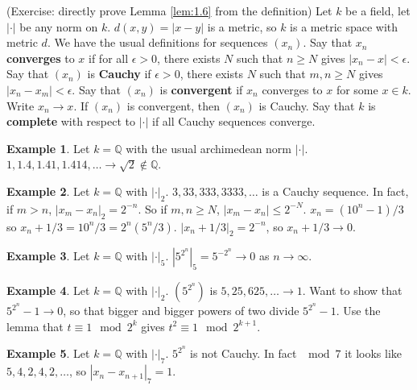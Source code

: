 \documentclass{article}
\newcommand{\Q}{\mathbb{Q}}
\newcommand{\rb}[1]{\left( #1 \right)}
\newcommand{\abs}[1]{\left\lvert #1 \right\rvert}
\theoremstyle{definition}\newtheorem{definition}{Definition}[section]
\theoremstyle{definition}\newtheorem{remark}[definition]{Remark}
\theoremstyle{definition}\newtheorem*{example}{Example}
\theoremstyle{definition}\newtheorem*{note}{Note}
\begin{document}
(Exercise: directly prove Lemma \ref{lem:1.6} from the definition) Let $ k $ be a field, let $ \abs{\cdot} $ be any norm on $ k $. $ d\rb{x, y} = \abs{x - y} $ is a metric, so $ k $ is a metric space with metric $ d $. We have the usual definitions for sequences $ \rb{x_n} $. Say that $ x_n $ \textbf{converges} to $ x $ if for all $ \epsilon > 0 $, there exists $ N $ such that $ n \ge N $ gives $ \abs{x_n - x} < \epsilon $. Say that $ \rb{x_n} $ is \textbf{Cauchy} if $ \epsilon > 0 $, there exists $ N $ such that $ m, n \ge N $ gives $ \abs{x_n - x_m} < \epsilon $. Say that $ \rb{x_n} $ is \textbf{convergent} if $ x_n $ converges to $ x $ for some $ x \in k $. Write $ x_n \to x $. If $ \rb{x_n} $ is convergent, then $ \rb{x_n} $ is Cauchy. Say that $ k $ is \textbf{complete} with respect to $ \abs{\cdot} $ if all Cauchy sequences converge.

\begin{example}
Let $ k = \Q $ with the usual archimedean norm $ \abs{\cdot} $. $ 1, 1.4, 1.41, 1.414, \dots \to \sqrt{2} \notin \Q $.
\end{example}

\begin{example}
Let $ k = \Q $ with $ \abs{\cdot}_2 $. $ 3, 33, 333, 3333, \dots $ is a Cauchy sequence. In fact, if $ m > n $, $ \abs{x_m - x_n}_2 = 2^{-n} $. So if $ m, n \ge N $, $ \abs{x_m - x_n} \le 2^{-N} $. $ x_n = \rb{10^n - 1} / 3 $ so $ x_n + 1 / 3 = 10^n / 3 = 2^n\rb{5^n / 3} $. $ \abs{x_n + 1 / 3}_2 = 2^{-n} $, so $ x_n + 1 / 3 \to 0 $.
\end{example}

\begin{example}
Let $ k = \Q $ with $ \abs{\cdot}_5 $. $ \abs{5^{2^n}}_5 = 5^{-2^n} \to 0 $ as $ n \to \infty $.
\end{example}

\begin{example}
Let $ k = \Q $ with $ \abs{\cdot}_2 $. $ \rb{5^{2^n}} $ is $ 5, 25, 625, \dots \to 1 $. Want to show that $ 5^{2^n} - 1 \to 0 $, so that bigger and bigger powers of two divide $ 5^{2^n} - 1 $. Use the lemma that $ t \equiv 1 \mod 2^k $ gives $ t^2 \equiv 1 \mod 2^{k + 1} $.
\end{example}

\begin{example}
Let $ k = \Q $ with $ \abs{\cdot}_7 $. $ 5^{2^n} $ is not Cauchy. In fact $ \mod 7 $ it looks like $ 5, 4, 2, 4, 2, \dots $, so $ \abs{x_n - x_{n + 1}}_7 = 1 $.
\end{example}
\end{document}
